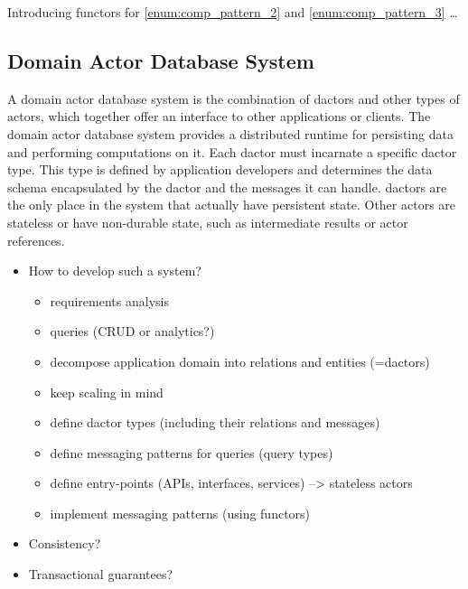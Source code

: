     Introducing functors for \ref{enum:comp_pattern_2} and \ref{enum:comp_pattern_3} \dots


  \subsection{Domain Actor Database System}\label{sec:domain_actor_database}
    A domain actor database system is the combination of \glspl{dactor} and other types of actors, which together offer an interface to other applications or clients.
    The domain actor database system provides a distributed runtime for persisting data and performing computations on it.
    Each \gls{dactor} must incarnate a specific \gls{dactor} type.
    This type is defined by application developers and determines the data schema encapsulated by the \gls{dactor} and the messages it can handle.
    \glspl{dactor} are the only place in the system that actually have persistent state.
    Other actors are stateless or have non-durable state, such as intermediate results or actor references.

    \begin{itemize}
      \item How to develop such a system?
        \begin{itemize}
            \item requirements analysis
            \item queries (CRUD or analytics?)
            \item decompose application domain into relations and entities (=dactors)
            \item keep scaling in mind
            \item define dactor types (including their relations and messages)
            \item define messaging patterns for queries (query types)
            \item define entry-points (APIs, interfaces, services) --> stateless actors
            \item implement messaging patterns (using functors)
        \end{itemize}
      \item Consistency?
      \item Transactional guarantees?
    \end{itemize}




